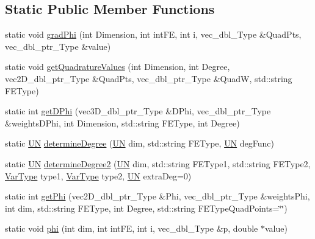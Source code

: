 \subsection*{Static Public Member Functions}
\begin{DoxyCompactItemize}
\item 
static void \hyperlink{classFEDD_1_1Helper_a86db0eff29bd3d7e6d7853436a9e5e37}{grad\+Phi} (int Dimension, int int\+FE, int i, vec\+\_\+dbl\+\_\+\+Type \&Quad\+Pts, vec\+\_\+dbl\+\_\+ptr\+\_\+\+Type \&value)
\item 
static void \hyperlink{classFEDD_1_1Helper_afed2032e131e00f658402817f66d9cfd}{get\+Quadrature\+Values} (int Dimension, int Degree, vec2\+D\+\_\+dbl\+\_\+ptr\+\_\+\+Type \&Quad\+Pts, vec\+\_\+dbl\+\_\+ptr\+\_\+\+Type \&QuadW, std\+::string F\+E\+Type)
\item 
static int \hyperlink{classFEDD_1_1Helper_aec6f9bc4208c7ce02f2bebad7a98e7d1}{get\+D\+Phi} (vec3\+D\+\_\+dbl\+\_\+ptr\+\_\+\+Type \&D\+Phi, vec\+\_\+dbl\+\_\+ptr\+\_\+\+Type \&weights\+D\+Phi, int Dimension, std\+::string F\+E\+Type, int Degree)
\item 
static \hyperlink{fe__test__laplace_8cpp_a223307b878979b01e3ac887d91865ab5}{UN} \hyperlink{classFEDD_1_1Helper_a62c020fe93bef461eb74528cb7f19511}{determine\+Degree} (\hyperlink{fe__test__laplace_8cpp_a223307b878979b01e3ac887d91865ab5}{UN} dim, std\+::string F\+E\+Type, \hyperlink{fe__test__laplace_8cpp_a223307b878979b01e3ac887d91865ab5}{UN} deg\+Func)
\item 
static \hyperlink{fe__test__laplace_8cpp_a223307b878979b01e3ac887d91865ab5}{UN} \hyperlink{classFEDD_1_1Helper_ace7ad8b7d83b47bfd03bda783c18ad89}{determine\+Degree2} (\hyperlink{fe__test__laplace_8cpp_a223307b878979b01e3ac887d91865ab5}{UN} dim, std\+::string F\+E\+Type1, std\+::string F\+E\+Type2, \hyperlink{classFEDD_1_1Helper_a9cb6017aaedca354e0402b8ff3b70844}{Var\+Type} type1, \hyperlink{classFEDD_1_1Helper_a9cb6017aaedca354e0402b8ff3b70844}{Var\+Type} type2, \hyperlink{fe__test__laplace_8cpp_a223307b878979b01e3ac887d91865ab5}{UN} extra\+Deg=0)
\item 
static int \hyperlink{classFEDD_1_1Helper_ac15451b565dee93fa08b63c7a2957480}{get\+Phi} (vec2\+D\+\_\+dbl\+\_\+ptr\+\_\+\+Type \&Phi, vec\+\_\+dbl\+\_\+ptr\+\_\+\+Type \&weights\+Phi, int dim, std\+::string F\+E\+Type, int Degree, std\+::string F\+E\+Type\+Quad\+Points=\char`\"{}\char`\"{})
\item 
static void \hyperlink{classFEDD_1_1Helper_aca7380d78c4202232789905290c682a3}{phi} (int dim, int int\+FE, int i, vec\+\_\+dbl\+\_\+\+Type \&p, double $\ast$value)
\end{DoxyCompactItemize}
